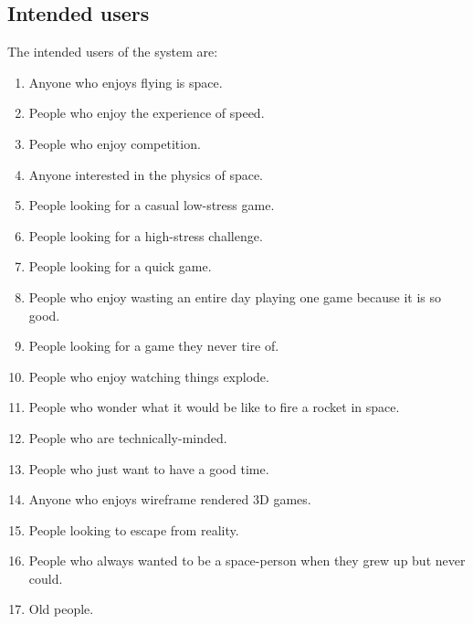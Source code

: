 \subsection*{Intended users}

The intended users of the system are:

\begin{enumerate}

  \item Anyone who enjoys flying is space.

  \item People who enjoy the experience of speed.

  \item People who enjoy competition.

  \item Anyone interested in the physics of space.

  \item People looking for a casual low-stress game.

  \item People looking for a high-stress challenge.

  \item People looking for a quick game.

  \item People who enjoy wasting an entire day playing one game because it is so good.

  \item People looking for a game they never tire of.

  \item People who enjoy watching things explode.

  \item People who wonder what it would be like to fire a rocket in space.

  \item People who are technically-minded.

  \item People who just want to have a good time.

  \item Anyone who enjoys wireframe rendered 3D games.

  \item People looking to escape from reality.

  \item People who always wanted to be a space-person when they grew up but never could.

  \item Old people.


\end{enumerate}

